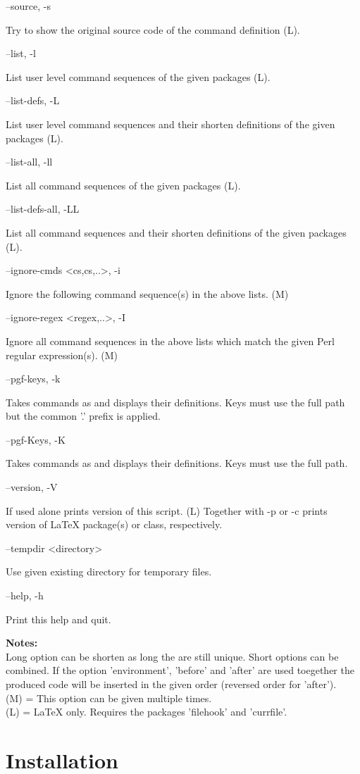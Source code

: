 \documentclass{ydoc}
\newenvironment{options}{%
    \def\cstart{\begingroup\ttfamily\par\noindent\ignorespaces}%
    \def\csep{\endgroup\begingroup\list {}{}\item \relax}%
    \def\cend{\endlist\par\medskip\endgroup\cstart}%
    \cstart
}{%
    \endgroup
}
\begin{document}
\begin{options}
  --source, -s                                       \csep Try to show the original source code of the command definition (L).\cend
  --list, -l                                         \csep List user level command sequences of the given packages (L).\cend
  --list-defs, -L                                    \csep List user level command sequences and their shorten definitions of the given packages (L).\cend
  --list-all, -ll                                    \csep List all command sequences of the given packages (L).\cend
  --list-defs-all, -LL                               \csep List all command sequences and their shorten definitions of the given packages (L).\cend
  --ignore-cmds \MacroArgs<cs,cs,..>,  -i            \csep Ignore the following command sequence(s) in the above lists. (M)\cend
  --ignore-regex \MacroArgs<regex,..>, -I            \csep Ignore all command sequences in the above lists which match the given Perl regular expression(s). (M)\cend
  --pgf-keys, -k                                     \csep Takes commands as  and displays their definitions. Keys must use the full path but the common '.\@cmd' prefix is applied.\cend
  --pgf-Keys, -K                                     \csep Takes commands as  and displays their definitions. Keys must use the full path.\cend
  --version, -V                                      \csep If used alone prints version of this script.
                                                       (L) Together with -p or -c prints version of LaTeX package(s) or class, respectively.\cend
  --tempdir <directory>                              \csep Use given existing directory for temporary files.\cend
  --help, -h                                         \csep Print this help and quit.\cend
\end{options}

\noindent \textbf{Notes:}\\
 Long option can be shorten as long the are still unique.  Short options can be combined.
 If the option 'environment', 'before' and 'after' are used toegether the
 produced code will be inserted in the given order (reversed order for 'after').\\
 (M) = This option can be given multiple times.\\
 (L) = LaTeX only. Requires the packages 'filehook' and 'currfile'.


\section{Installation}\label{sec:install}
\end{document}
